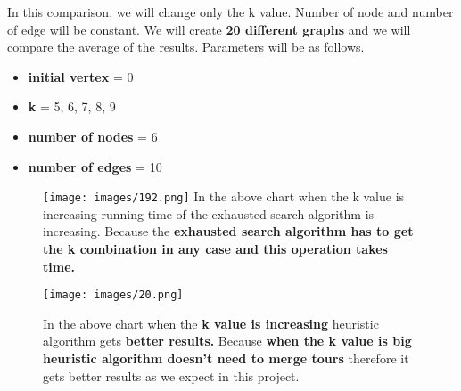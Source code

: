 \documentclass{beamer}
\begin{document}
\begin{projecttimeline2}

In this comparison, we will change only the k value. Number of node and number of edge will be constant. We will create \textbf{20 different graphs} and we will compare the average of the results.
\newline
\newline
Parameters will be as follows.
\vspace{0.03\textheight}
\begin{itemize}
 \item \textbf{initial vertex} = 0 
 \vspace{0.02\textheight}
 \item \textbf{k} = 5, 6, 7, 8, 9
 \vspace{0.02\textheight}
 \item \textbf{number of nodes} = 6
 \vspace{0.02\textheight}
 \item \textbf{number of edges} = 10
\end{itemize}
 
\end{projecttimeline2}

\begin{projecttimeline3}

\begin{figure}
    \texttt{[image: images/192.png]}
    In the above chart when the k value is increasing running time of the exhausted search algorithm is increasing. Because the \textbf{exhausted search algorithm has to get the k combination in any case and this operation takes time.}
\end{figure}
	
\end{projecttimeline3}

\begin{projecttimeline4}

\begin{figure}
		    
    \texttt{[image: images/20.png]}
    
     In the above chart when the \textbf{k value is increasing} heuristic algorithm gets \textbf{better results.} Because \textbf{when the k value is big heuristic algorithm doesn't need to merge tours} therefore it gets better results as we expect in this project.
    
\end{figure}
 
\end{projecttimeline4}
\end{document}
